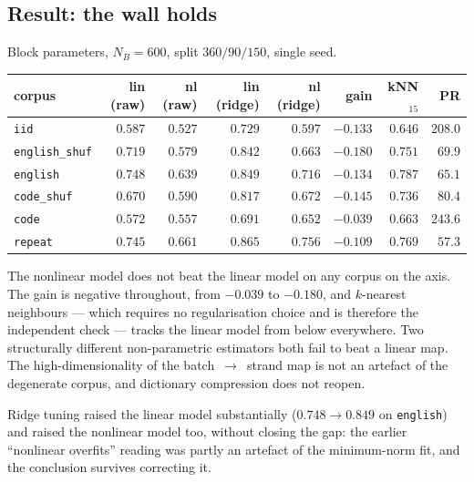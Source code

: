 \subsection{Result: the wall holds}
\label{sec:idprobe-result}

Block parameters, $N_B=600$, split $360/90/150$, single seed.

\begin{center}
\begin{tabular}{lrrrrrrr}
\hline
corpus & lin (raw) & nl (raw) & lin (ridge) & nl (ridge) & gain & kNN$_{15}$ & PR \\
\hline
\texttt{iid}          & $0.587$ & $0.527$ & $0.729$ & $0.597$ & $-0.133$ & $0.646$ & $208.0$ \\
\texttt{english\_shuf}& $0.719$ & $0.579$ & $0.842$ & $0.663$ & $-0.180$ & $0.751$ & $69.9$ \\
\texttt{english}      & $0.748$ & $0.639$ & $0.849$ & $0.716$ & $-0.134$ & $0.787$ & $65.1$ \\
\texttt{code\_shuf}   & $0.670$ & $0.590$ & $0.817$ & $0.672$ & $-0.145$ & $0.736$ & $80.4$ \\
\texttt{code}         & $0.572$ & $0.557$ & $0.691$ & $0.652$ & $-0.039$ & $0.663$ & $243.6$ \\
\texttt{repeat}       & $0.745$ & $0.661$ & $0.865$ & $0.756$ & $-0.109$ & $0.769$ & $57.3$ \\
\hline
\end{tabular}
\end{center}

\begin{observation}
\label{obs:no-manifold}
The nonlinear model does not beat the linear model on any corpus on the axis.
The gain is negative throughout, from $-0.039$ to $-0.180$, and $k$-nearest
neighbours --- which requires no regularisation choice and is therefore the
independent check --- tracks the linear model from below everywhere. Two
structurally different non-parametric estimators both fail to beat a linear
map. The high-dimensionality of the batch~$\to$~strand map is not an artefact
of the degenerate corpus, and dictionary compression does not reopen.
\end{observation}

Ridge tuning raised the linear model substantially ($0.748\to0.849$ on
\texttt{english}) and raised the nonlinear model too, without closing the gap:
the earlier ``nonlinear overfits'' reading was partly an artefact of the
minimum-norm fit, and the conclusion survives correcting it.

